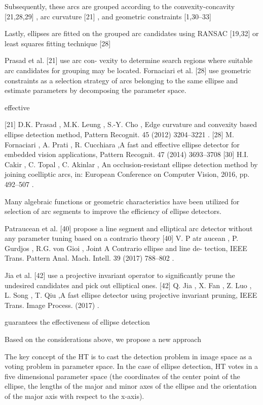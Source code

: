 \documentclass[a4paper]{report}
\begin{document}
Subsequently, these arcs are grouped according to the convexity-concavity [21,28,29] , arc curvature [21] , and geometric constraints [1,30–33] 

Lastly, ellipses are fitted on the grouped arc candidates using RANSAC [19,32] or least squares fitting technique [28]

Prasad et al. [21] use arc con- vexity to determine search regions where suitable arc candidates for grouping may be located. Fornaciari et al. [28] use geometric constraints as a selection strategy of arcs belonging to the same ellipse and estimate parameters by decomposing the parameter space.

effective

[21] D.K. Prasad , M.K. Leung , S.-Y. Cho , Edge curvature and convexity based ellipse detection method, Pattern Recognit. 45 (2012) 3204–3221 .
[28] M. Fornaciari , A. Prati , R. Cucchiara ,A fast and effective ellipse detector for embedded vision applications, Pattern Recognit. 47 (2014) 3693–3708
[30] H.I. Cakir , C. Topal , C. Akinlar , An occlusion-resistant ellipse detection method by joining coelliptic arcs, in: European Conference on Computer Vision, 2016, pp. 492–507 .


Many algebraic functions or geometric characteristics have been utilized for selection of arc segments to improve the efficiency of ellipse detectors.

Patraucean et al. [40] propose a line segment and elliptical arc detector without any parameter tuning based on a contrario theory
[40] V. P atr aucean , P. Gurdjos , R.G. von Gioi , Joint A Contrario ellipse and line de- tection, IEEE Trans. Pattern Anal. Mach. Intell. 39 (2017) 788–802 .

Jia et al. [42] use a projective invariant operator to significantly prune the undesired candidates and pick out elliptical ones. 
[42] Q. Jia , X. Fan , Z. Luo , L. Song , T. Qiu ,A fast ellipse detector using projective invariant pruning, IEEE Trans. Image Process. (2017) .

guarantees the effectiveness of ellipse detection

Based on the considerations above, we propose a new approach

The key concept of the HT is to cast the detection problem in image space as a voting problem in parameter space. In the case of ellipse detection, HT votes in a five dimensional parameter space (the coordinates
of the center point of the ellipse, the lengths of the major
and minor axes of the ellipse and the orientation of the major axis
with respect to the x-axis).
\end{document}
